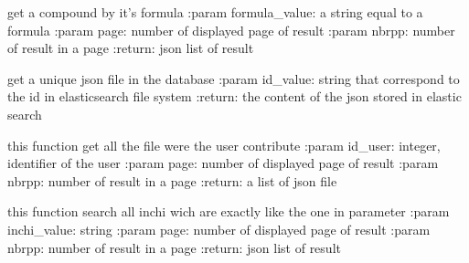 \documentclass[letterpaper,10pt,english]{sphinxmanual}
\begin{document}

\begin{fulllineitems}
\label{\detokenize{QuChemPedIA:QuChemPedIA.search.search_formula}}
get a compound by it’s formula
:param formula\_value: a string equal to a formula
:param page: number of displayed page of result
:param nbrpp: number of result in a page
:return: json list of result

\end{fulllineitems}


\begin{fulllineitems}
\label{\detokenize{QuChemPedIA:QuChemPedIA.search.search_id}}
get a unique json file in the database
:param id\_value: string that correspond to the id in elasticsearch file system
:return: the content of the json stored in elastic search

\end{fulllineitems}


\begin{fulllineitems}
\label{\detokenize{QuChemPedIA:QuChemPedIA.search.search_id_user}}
this function get all the file were the user contribute
:param id\_user: integer, identifier of the user
:param page: number of displayed page of result
:param nbrpp: number of result in a page
:return: a list of json file

\end{fulllineitems}


\begin{fulllineitems}
\label{\detokenize{QuChemPedIA:QuChemPedIA.search.search_inchi}}
this function search all inchi wich are exactly like the one in parameter
:param inchi\_value: string
:param page: number of displayed page of result
:param nbrpp: number of result in a page
:return: json list of result

\end{fulllineitems}
\end{document}
